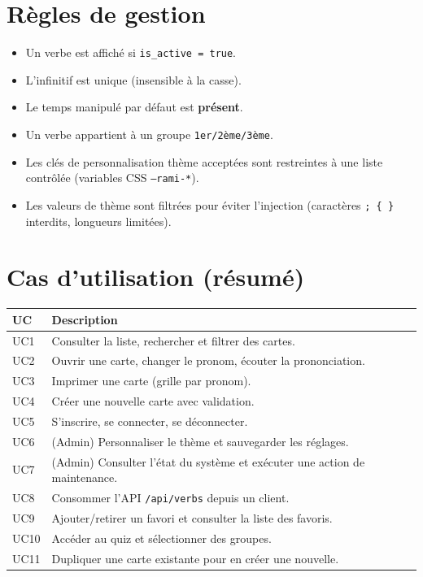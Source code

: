 \documentclass[12pt,a4paper]{article}
\begin{document}
\section{Règles de gestion}
\begin{itemize}[leftmargin=*]
  \item Un verbe est affiché si \texttt{is\_active = true}.
  \item L'infinitif est unique (insensible à la casse).
  \item Le temps manipulé par défaut est \textbf{présent}.
  \item Un verbe appartient à un groupe \texttt{1er/2ème/3ème}.
  \item Les clés de personnalisation thème acceptées sont restreintes à une liste contrôlée (variables CSS \texttt{--rami-*}).
  \item Les valeurs de thème sont filtrées pour éviter l'injection (caractères \texttt{; \{ \}} interdits, longueurs limitées).
\end{itemize}

\section{Cas d'utilisation (résumé)}
\begin{longtable}{@{}p{3.5cm}p{11cm}@{}}
\toprule
\textbf{UC} & \textbf{Description} \\
\midrule
\endhead
UC1 & Consulter la liste, rechercher et filtrer des cartes. \\
UC2 & Ouvrir une carte, changer le pronom, écouter la prononciation. \\
UC3 & Imprimer une carte (grille par pronom). \\
UC4 & Créer une nouvelle carte avec validation. \\
UC5 & S'inscrire, se connecter, se déconnecter. \\
UC6 & (Admin) Personnaliser le thème et sauvegarder les réglages. \\
UC7 & (Admin) Consulter l'état du système et exécuter une action de maintenance. \\
UC8 & Consommer l'API \texttt{/api/verbs} depuis un client. \\
UC9 & Ajouter/retirer un favori et consulter la liste des favoris. \\
UC10 & Accéder au quiz et sélectionner des groupes. \\
UC11 & Dupliquer une carte existante pour en créer une nouvelle. \\
\bottomrule
\end{longtable}
\end{document}

